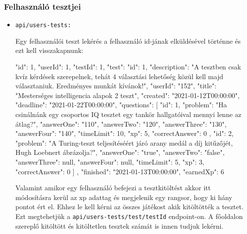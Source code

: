\subsubsection{Felhasználó tesztjei}
\begin{itemize}[label={$\bullet$}, topsep=0pt, itemsep=0pt, leftmargin=15pt]
    \item[] {\nolinkurl{api/users-tests:}}
          \begin{addmargin}[\parindent]{0pt}
            Egy felhasználói teszt lekérés a felhasználó id-jának elküldésével történne és ezt kell visszakapnunk:
              \begin{json}
{
    "id": 1,
    "userId": 1,
    "testId": 1,
    "test": {
        "id": 1,
        "description": "A tesztben csak kvíz kérdések szerepelnek, tehát 4 választási lehetőség közül kell majd választaniuk. Eredményes munkát kívánok!",
        "userId": "152",
        "title": "Mesterséges intelligencia alapok 2 teszt",
        "created": "2021-01-12T00:00:00",
        "deadline": "2021-01-22T00:00:00",
        "questions": [
            {
                "id": 1,
                "problem": "Ha csinálnánk egy csoportos IQ tesztet egy tankör hallgatóival mennyi lenne az átlag?",
                "answerOne": "110",
                "answerTwo": "120",
                "answerThree": "130",
                "answerFour": "140",
                "timeLimit": 10,
                "xp": 5,
                "correctAnswer": 0
            },
            {
                "id": 2,
                "problem": "A Turing-teszt teljesítéséért járó arany medál a díj kitűzőjét, Hugh Loebnert ábrázolja?",
                "answerOne": "true",
                "answerTwo": "false",
                "answerThree": null,
                "answerFour": null,
                "timeLimit": 5,
                "xp": 3,
                "correctAnswer": 0
            }
        ]
    },
    "finished": "2021-01-13T00:00:00",
    "earnedXp": 6
}
              \end{json}

              Valamint amikor egy felhasználó befejezi a tesztkitöltést akkor itt módosításra kerül az xp adattag és megjelenik egy rangsor, hogy ki hány pontot ért el. Ehhez le kell kérni az összes játékost akik kitöltötték a tesztet. Ezt megtehetjük a \nolinkurl{api/users-tests/test/testId} endpoint-on. A főoldalon szereplő kitöltött és kitöltetlen tesztek számát is innen tudjuk lekérni.
          \end{addmargin}
\end{itemize}

